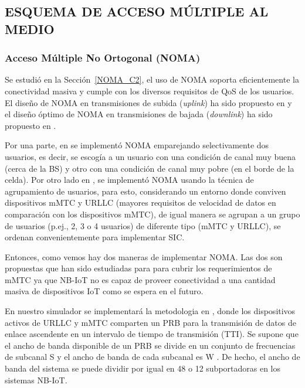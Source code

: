 \subsection{ESQUEMA DE ACCESO MÚLTIPLE AL MEDIO}

\subsubsection{Acceso Múltiple No Ortogonal (NOMA)}\label{NOMA_C4}

Se estudió en la Sección~\ref{NOMA_C2}, el uso de NOMA soporta eficientemente la conectividad masiva y cumple con los diversos requisitos de QoS de los usuarios. El diseño de NOMA en transmisiones de subida (\textit{uplink}) ha sido propuesto en \parencite{Al-Imari2014} y el diseño óptimo de NOMA en transmisiones de bajada (\textit{downlink}) ha sido propuesto en \parencite{Zhu2019}.\newline

Por una parte, en \parencite{Zhang2017} se implementó NOMA emparejando selectivamente dos usuarios, es decir, se escogía a un usuario con una condición de canal muy buena (cerca de la BS) y otro con una condición de canal muy pobre (en el borde de la celda). Por otro lado en \parencite{Shahini2019}, se implementó NOMA usando la técnica de agrupamiento de usuarios, para esto, considerando un entorno donde conviven dispositivos mMTC y URLLC (mayores requisitos de velocidad de datos en comparación con los dispositivos mMTC), de igual manera se agrupan a un grupo de usuarios (p.ej., 2, 3 o 4 usuarios) de diferente tipo (mMTC y URLLC), se ordenan convenientemente para implementar SIC.\newline

Entonces, como vemos hay dos maneras de implementar NOMA. Las dos son propuestas que han sido estudiadas para para cubrir los requerimientos de mMTC ya que NB-IoT no es capaz de proveer conectividad a una cantidad masiva de dispositivos IoT como se espera en el futuro.\newline

En nuestro simulador se implementará la metodologia en \parencite{Shahini2019}, donde los dispositivos activos de URLLC y mMTC comparten un PRB para la transmisión de datos de enlace ascendente en un intervalo de tiempo de transmisión (TTI). Se supone que el ancho de banda disponible de un PRB se divide en un conjunto de frecuencias de subcanal S y el ancho de banda de cada subcanal es W . De hecho, el ancho de banda del sistema se puede dividir por igual en 48 o 12 subportadoras en los sistemas NB-IoT.\newline

